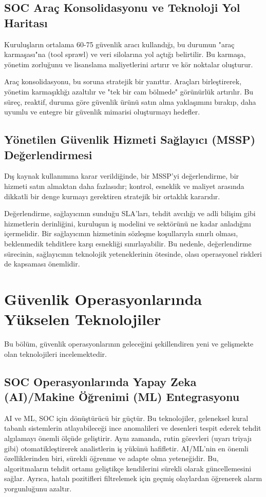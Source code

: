 \subsection{SOC Araç Konsolidasyonu ve Teknoloji Yol Haritası}

Kuruluşların ortalama 60-75 güvenlik aracı kullandığı, bu durumun "araç karmaşası"na (tool sprawl) ve veri silolarına yol açtığı belirtilir. Bu karmaşa, yönetim zorluğunu ve lisanslama maliyetlerini artırır ve kör noktalar oluşturur.

Araç konsolidasyonu, bu soruna stratejik bir yanıttır. Araçları birleştirerek, yönetim karmaşıklığı azaltılır ve "tek bir cam bölmede" görünürlük artırılır. Bu süreç, reaktif, duruma göre güvenlik ürünü satın alma yaklaşımını bırakıp, daha uyumlu ve entegre bir güvenlik mimarisi oluşturmayı hedefler.

\subsection{Yönetilen Güvenlik Hizmeti Sağlayıcı (MSSP) Değerlendirmesi}

Dış kaynak kullanımına karar verildiğinde, bir MSSP'yi değerlendirme, bir hizmeti satın almaktan daha fazlasıdır; kontrol, esneklik ve maliyet arasında dikkatli bir denge kurmayı gerektiren stratejik bir ortaklık kararıdır.

Değerlendirme, sağlayıcının sunduğu SLA'ları, tehdit avcılığı ve adli bilişim gibi hizmetlerin derinliğini, kuruluşun iş modelini ve sektörünü ne kadar anladığını içermelidir. Bir sağlayıcının hizmetinin sözleşme koşullarıyla sınırlı olması, beklenmedik tehditlere karşı esnekliği sınırlayabilir. Bu nedenle, değerlendirme sürecinin, sağlayıcının teknolojik yeteneklerinin ötesinde, olası operasyonel riskleri de kapsaması önemlidir.

\section{Güvenlik Operasyonlarında Yükselen Teknolojiler}

Bu bölüm, güvenlik operasyonlarının geleceğini şekillendiren yeni ve gelişmekte olan teknolojileri incelemektedir.

\subsection{SOC Operasyonlarında Yapay Zeka (AI)/Makine Öğrenimi (ML) Entegrasyonu}

AI ve ML, SOC için dönüştürücü bir güçtür. Bu teknolojiler, geleneksel kural tabanlı sistemlerin atlayabileceği ince anomalileri ve desenleri tespit ederek tehdit algılamayı önemli ölçüde geliştirir. Aynı zamanda, rutin görevleri (uyarı triyajı gibi) otomatikleştirerek analistlerin iş yükünü hafifletir. AI/ML'nin en önemli özelliklerinden biri, sürekli öğrenme ve adapte olma yeteneğidir. Bu, algoritmaların tehdit ortamı geliştikçe kendilerini sürekli olarak güncellemesini sağlar. Ayrıca, hatalı pozitifleri filtrelemek için geçmiş olaylardan öğrenerek alarm yorgunluğunu azaltır.

